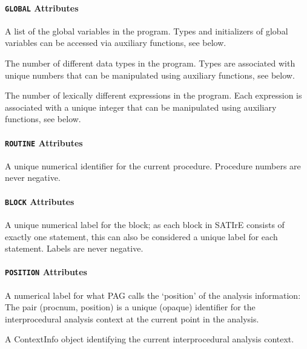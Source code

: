 \documentclass[a4paper,12pt]{report}
\begin{document}
\paragraph{\texttt{GLOBAL} Attributes}
\begin{description}
    A list of the global variables in the program. Types and initializers of
    global variables can be accessed via auxiliary functions, see below.

    The number of different data types in the program. Types are associated
    with unique numbers that can be manipulated using auxiliary functions,
    see below.

    The number of lexically different expressions in the program. Each
    expression is associated with a unique integer that can be manipulated
    using auxiliary functions, see below.
\end{description}

\paragraph{\texttt{ROUTINE} Attributes}
\begin{description}
    A unique numerical identifier for the current procedure. Procedure
    numbers are never negative.
\end{description}

\paragraph{\texttt{BLOCK} Attributes}
\begin{description}
    A unique numerical label for the block; as each block in SATIrE consists
    of exactly one statement, this can also be considered a unique label for
    each statement. Labels are never negative.
\end{description}

\paragraph{\texttt{POSITION} Attributes}
\begin{description}
    A numerical label for what PAG calls the `position' of the analysis
    information: The pair (procnum, position) is a unique (opaque)
    identifier for the interprocedural analysis context at the current point
    in the analysis.

    A ContextInfo object identifying the current interprocedural analysis
    context.
\end{description}
\end{document}
